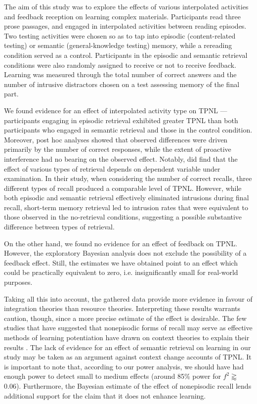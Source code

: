 \documentclass[../main.tex]{subfiles}
\begin{document}
	
The aim of this study was to explore the effects of various interpolated activities
and feedback reception on learning complex materials. Participants read three prose
passages, and engaged in interpolated activities between reading episodes. Two 
testing activities were chosen so as to tap into episodic (content-related testing) 
or semantic (general-knowledge testing) memory, while a rereading condition served 
as a control. Participants in the episodic and semantic retrieval conditions were 
also randomly assigned to receive or not to receive feedback. Learning was measured 
through the total number of correct answers and the number of intrusive distractors 
chosen on a test assessing memory of the final part.

We found evidence for an effect of interpolated activity type on TPNL --- participants 
engaging in episodic retrieval exhibited greater TPNL than both participants who engaged in 
semantic retrieval and those in the control condition. Moreover, post hoc analyses
showed that observed differences were driven primarily by the number of correct
responses, while the extent of proactive interference had no bearing on the observed
effect. Notably, \cite{pastotterRetrievalLearningFacilitates2011} did find that the 
effect of various types of retrieval depends on dependent variable under examination. 
In their study, when considering the number of correct recalls, three different types of recall produced a comparable level of TPNL. However, while both episodic and semantic
retrieval effectively eliminated intrusions during final recall, short-term memory
retrieval led to intrusion rates that were equivalent to those observed in the 
no-retrieval conditions, suggesting a possible substantive difference between types 
of retrieval.

On the other hand, we found no evidence for an effect of feedback on TPNL. However, 
the exploratory Bayesian analysis does not exclude the possibility of a feedback effect. 
Still, the estimates we have obtained point to an effect which could be practically 
equivalent to zero, i.e. insignificantly small for real-world purposes.

Taking all this into account, the gathered data provide more evidence in
favour of integration theories than resource theories. Interpreting these results
warrants caution, though, since a more precise estimate of the effect is desirable.
The few studies that have suggested that nonepisodic forms of recall may serve
as effective methods of learning potentiation have drawn on context theories to
explain their results \citep{divisRetrievalSpeedsContext2014, pastotterRetrievalLearningFacilitates2011}.
The lack of evidence for an effect of semantic retrieval on learning
in our study may be taken as an argument against context change accounts of
TPNL. It is important to note that, according to our power analysis, we should
have had enough power to detect small to medium effects (around 85\% power for
\(f^2 \gtrapprox\) 0.06). Furthermore, the Bayesian estimate of the effect of
nonepisodic recall lends additional support for the claim that it does not
enhance learning.
\end{document}

